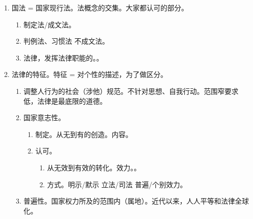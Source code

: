 \begin{enumerate}
        \begin{enumerate}
          \item 正式性/国家性/官方性。
          \item 阶级性。体现统治阶级的意志，代表最先进的生产力。意志 3 性。
                \begin{enumerate}
                  \item 唯一性。是、并且永远是统治阶级意志的体现。
                  \item 整体性。为了整体，可以牺牲个人。
                  \item 长远性。长远利益，可以牺牲当下。
                \end{enumerate}
          \item 物质制约性/社会性。物质生活条件（硬件）才是法律（软件）内容的决定性（最终非唯一）因素。
        \end{enumerate}
  \item 国法 = 国家现行法。法概念的交集。大家都认可的部分。
        \begin{enumerate}
          \item 制定法/成文法。
          \item 判例法、习惯法 \yjt 不成文法。
          \item \ydy 法律，发挥法律职能的。。
        \end{enumerate}
  \item 法律的特征。特征 = 对个性的描述，为了做区分。
        \begin{enumerate}
          \item 调整人行为的社会（涉他）规范。不针对思想、自我行动。范围窄要求低，法律是最底限的道德。
          \item 国家意志性。
                \begin{enumerate}
                  \item 制定。从无到有的创造。内容。
                  \item 认可。
                        \begin{enumerate}
                          \item 从无效到有效的转化。效力。。
                          \item 方式。明示/默示 \yjt 立法/司法 \yjt 普遍/个别效力。
                        \end{enumerate}
                \end{enumerate}
          \item 普遍性。\yi 国家权力所及的范围内（属地）。\er 近代以来，人人平等和法律全球化。

\end{enumerate}
\end{enumerate}
